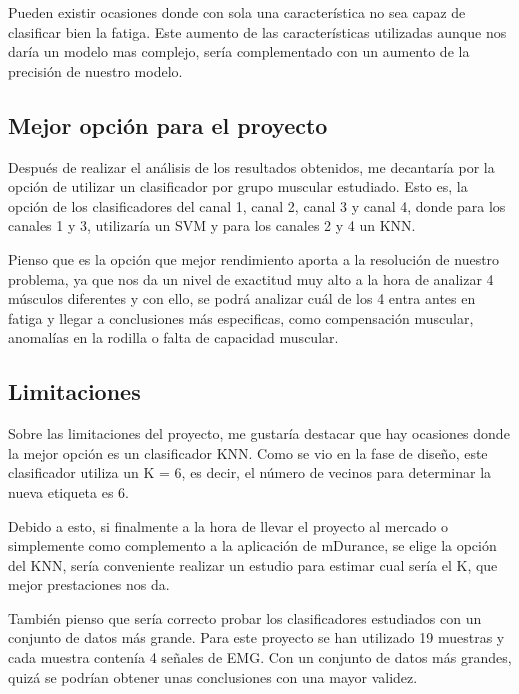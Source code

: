 Pueden existir ocasiones donde con sola una característica no sea capaz de clasificar bien la fatiga. Este aumento de las características utilizadas aunque nos daría un modelo mas complejo, sería complementado con un aumento de la precisión de nuestro modelo.


\subsection{Mejor opción para el proyecto}
Después de realizar el análisis de los resultados obtenidos, me decantaría por la opción de utilizar un clasificador por grupo muscular estudiado. Esto es, la opción de los clasificadores del canal 1, canal 2, canal 3 y canal 4, donde para los canales 1 y 3, utilizaría un SVM y para los canales 2 y 4 un KNN.

Pienso que es la opción que mejor rendimiento aporta a la resolución de nuestro problema, ya que nos da un nivel de exactitud muy alto a la hora de analizar 4 músculos diferentes y con ello, se podrá analizar cuál de los 4 entra antes en fatiga y llegar a conclusiones más especificas, como compensación muscular, anomalías en la rodilla o falta de capacidad muscular.


\subsection{Limitaciones}
Sobre las limitaciones del proyecto, me gustaría destacar que hay ocasiones donde la mejor opción es un clasificador KNN. Como se vio en la fase de diseño, este clasificador utiliza un K = 6, es decir, el número de vecinos para determinar la nueva etiqueta es 6. 

Debido a esto, si finalmente a la hora de llevar el proyecto al mercado o simplemente como complemento a la aplicación de mDurance, se elige la opción del KNN, sería conveniente realizar un estudio para estimar cual sería el K, que mejor prestaciones nos da.


También pienso que sería correcto probar los clasificadores estudiados con un conjunto de datos más grande. Para este proyecto se han utilizado 19 muestras y cada muestra contenía 4 señales de EMG. Con un conjunto de datos más grandes, quizá se podrían obtener unas conclusiones con una mayor validez.
